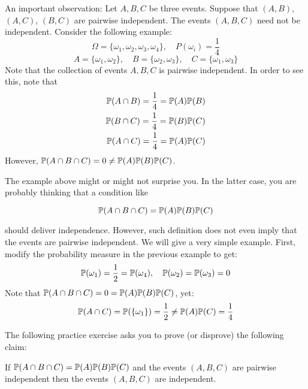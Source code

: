 \documentclass[11pt]{article} %
\begin{document}
An important observation: Let $A, B, C$ be three events. Suppose that $(A,B)$, $(A,C)$, $(B,C)$ are pairwise independent. The events $(A,B,C)$ need not be independent. Consider the following example:
\begin{equation*}
	\Omega=\{\omega_1, \omega_2, \omega_3, \omega_4\}, \quad P(\omega_i)=\frac{1}{4}
\end{equation*}
\begin{equation*}
	A= \{ \omega_1, \omega_2\}, \quad B= \{\omega_2, \omega_3\}, \quad C=\{\omega_1, \omega_3\}
\end{equation*}
	Note that the collection of events $A,B,C$ is pairwise independent. In order to see this, note that
\begin{eqnarray*}
\mathbb{P}(A \cap B) = \frac{1}{4}= \mathbb{P}(A) \mathbb{P}(B)\\
\mathbb{P}(B \cap C) = \frac{1}{4}= \mathbb{P}(B) \mathbb{P}(C)\\
\mathbb{P}(A \cap C) = \frac{1}{4}= \mathbb{P}(A) \mathbb{P}(C)
\end{eqnarray*}
However, $\mathbb{P}(A\cap B\cap C)= 0 \neq \mathbb{P}(A)\mathbb{P}(B)\mathbb{P}(C)$. 

The example above might or might not surprise you. In the latter case, you are probably thinking that a condition like

$$\mathbb{P}(A \cap B \cap C)=\mathbb{P}(A) \mathbb{P}(B) \mathbb{P}(C)$$

\noindent should deliver independence. However, such definition does not even imply that the events are pairwise independent. We will give a very simple example. First, modify the probability measure in the previous example to get:
\begin{equation*}
\mathbb{P}(\omega_1)= \frac{1}{2}=\mathbb{P}(\omega_4), \quad \mathbb{P}(\omega_2)=\mathbb{P}(\omega_3)=0
\end{equation*}
Note that $\mathbb{P}(A \cap B \cap C)=0=\mathbb{P}(A)\mathbb{P}(B)\mathbb{P}(C)$, yet:
\begin{equation*}
	\mathbb{P}(A \cap C)= \mathbb{P}(\{\omega_1\}) = \frac{1}{2} \neq \mathbb{P}(A)\mathbb{P}(C)= \frac{1}{4}
\end{equation*}

\noindent The following practice exercise asks you to prove (or disprove) the following claim:\\

 \begin{prproblem}
 If $\mathbb{P}(A \cap B \cap C)=\mathbb{P}(A)\mathbb{P}(B)\mathbb{P}(C)$ and the events $(A, B, C)$ are pairwise independent then the events $(A, B, C)$ are independent. 
\end{prproblem}
\end{document}
